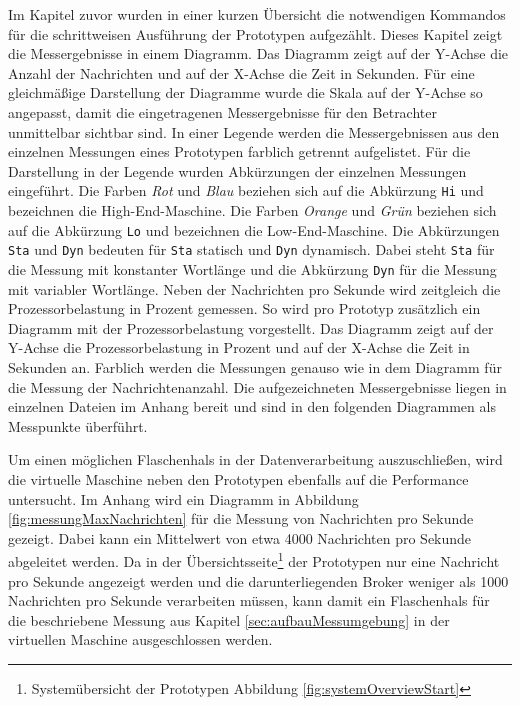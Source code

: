 Im Kapitel zuvor wurden in einer kurzen Übersicht die notwendigen Kommandos für die schrittweisen Ausführung der Prototypen aufgezählt. Dieses Kapitel zeigt die Messergebnisse in einem Diagramm. Das Diagramm zeigt auf der Y-Achse die Anzahl der Nachrichten und auf der X-Achse die Zeit in Sekunden. Für eine gleichmäßige Darstellung der Diagramme wurde die Skala auf der Y-Achse so angepasst, damit die eingetragenen Messergebnisse für den Betrachter unmittelbar sichtbar sind. In einer Legende werden die Messergebnissen aus den einzelnen Messungen eines Prototypen farblich getrennt aufgelistet. Für die Darstellung in der Legende wurden Abkürzungen der einzelnen Messungen eingeführt. Die Farben \textit{Rot} und \textit{Blau} beziehen sich auf die Abkürzung \texttt{Hi} und bezeichnen die High-End-Maschine. Die Farben \textit{Orange} und \textit{Grün} beziehen sich auf die Abkürzung \texttt{Lo} und bezeichnen die Low-End-Maschine. Die Abkürzungen \texttt{Sta} und \texttt{Dyn} bedeuten für \texttt{Sta} statisch und \texttt{Dyn} dynamisch. Dabei steht \texttt{Sta} für die Messung mit konstanter Wortlänge und die Abkürzung \texttt{Dyn} für die Messung mit variabler Wortlänge. Neben der Nachrichten pro Sekunde wird zeitgleich die Prozessorbelastung in Prozent gemessen. So wird pro Prototyp zusätzlich ein Diagramm mit der Prozessorbelastung vorgestellt. Das Diagramm zeigt auf der Y-Achse die Prozessorbelastung in Prozent und auf der X-Achse die Zeit in Sekunden an. Farblich werden die Messungen genauso wie in dem Diagramm für die Messung der Nachrichtenanzahl. Die aufgezeichneten Messergebnisse liegen in einzelnen Dateien im Anhang bereit und sind in den folgenden Diagrammen als Messpunkte überführt.

Um einen möglichen Flaschenhals in der Datenverarbeitung auszuschließen, wird die virtuelle Maschine neben den Prototypen ebenfalls auf die Performance untersucht. Im Anhang wird ein Diagramm in Abbildung \ref{fig:messungMaxNachrichten} für die Messung von Nachrichten pro Sekunde gezeigt. Dabei kann ein Mittelwert von etwa 4000 Nachrichten pro Sekunde abgeleitet werden. Da in der Übersichtsseite\footnote{Systemübersicht der Prototypen Abbildung \ref{fig:systemOverviewStart}} der Prototypen nur eine Nachricht pro Sekunde angezeigt werden und die darunterliegenden Broker weniger als 1000 Nachrichten pro Sekunde verarbeiten müssen, kann damit ein Flaschenhals für die beschriebene Messung aus Kapitel \ref{sec:aufbauMessumgebung} in der virtuellen Maschine  ausgeschlossen werden. 

